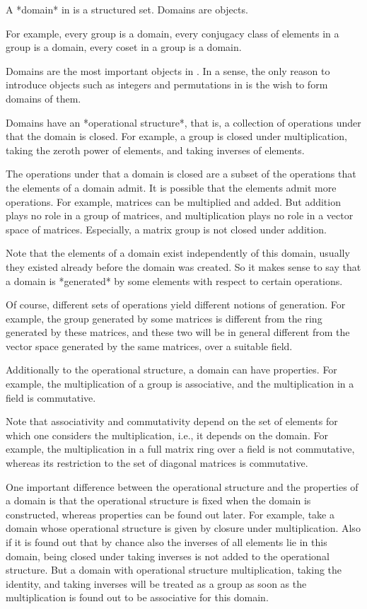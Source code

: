 
A *domain* in {\GAP} is a structured set.
Domains are objects.

For example, every group is a domain, every conjugacy class of elements
in a group is a domain, every coset in a group is a domain.

Domains are the most important objects in {\GAP}.
In a sense, the only reason to introduce objects such as integers and
permutations in {\GAP} is the wish to form domains of them.

Domains have an *operational structure*,
that is, a collection of operations under that the domain is closed.
For example, a group is closed under multiplication,
taking the zeroth power of elements, and taking inverses of elements.

The operations under that a domain is closed are a subset of
the operations that the elements of a domain admit.
It is possible that the elements admit more operations.
For example, matrices can be multiplied and added.
But addition plays no role in a group of matrices,
and multiplication plays no role in a vector space of matrices.
Especially, a matrix group is not closed under addition.

Note that the elements of a domain exist independently of this domain,
usually they existed already before the domain was created.
So it makes sense to say that a domain is *generated* by some elements
with respect to certain operations.

Of course, different sets of operations yield different notions of
generation.
For example, the group generated by some matrices is different from
the ring generated by these matrices, and these two will be in general
different from the vector space generated by the same matrices,
over a suitable field.

Additionally to the operational structure,
a domain can have properties.
For example, the multiplication of a group is associative,
and the multiplication in a field is commutative.

Note that associativity and commutativity depend on the set of
elements for which one considers the multiplication,
i.e., it depends on the domain.
For example, the multiplication in a full matrix ring over a field
is not commutative, whereas its restriction to the set of diagonal
matrices is commutative.

One important difference between the operational structure and the
properties of a domain is that the operational structure is fixed when
the domain is constructed, whereas properties can be found out later.
For example, take a domain whose operational structure is given by
closure under multiplication.
Also if it is found out that by chance also the inverses of all elements
lie in this domain,
being closed under taking inverses is not added to the operational
structure.
But a domain with operational structure multiplication,
taking the identity, and taking inverses
will be treated as a group as soon as the multiplication is found out to
be associative for this domain.

